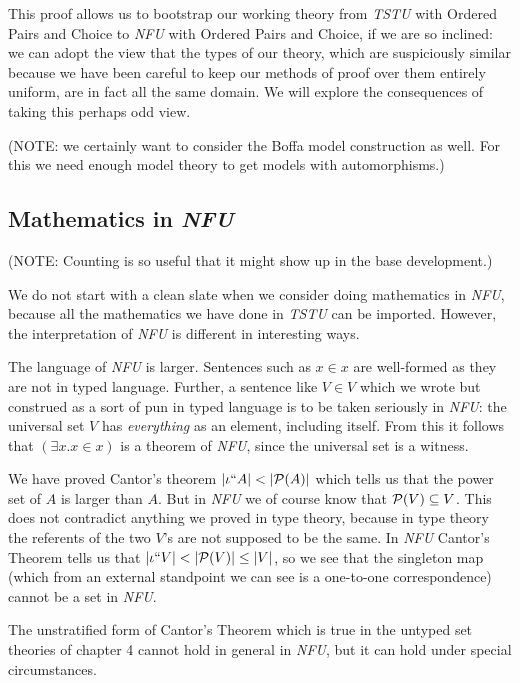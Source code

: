 \documentclass[12pt]{book}
\begin{document}
This proof allows us to bootstrap our working theory from {\em TSTU\/} with Ordered Pairs and Choice to {\em NFU\/} with Ordered Pairs and Choice, if we are so inclined:  we can adopt the view that the types of our theory, which are suspiciously similar because we have been careful to keep our methods of proof
over them entirely uniform, are in fact all the same domain.  We will explore the consequences of taking this perhaps odd view.

(NOTE:  we certainly want to consider the Boffa model construction as well.  For this we need enough model theory to get models with automorphisms.)


\subsection{Mathematics in {\em NFU\/}}

(NOTE:  Counting is so useful that it might show up in the base development.)

We do not start with a clean slate when we consider doing mathematics in {\em NFU\/}, because all the mathematics we have done in {\em TSTU\/} can be imported.  However, the interpretation of {\em NFU\/} is different in interesting ways.

The language of {\em NFU\/} is larger.  Sentences such as $x \in x$ are well-formed as they are not in typed language.  Further, a sentence like $V \in V$ which we wrote but construed as a sort of pun in typed language is to be taken seriously in 
{\em NFU\/}:  the universal set $V$ has {\em everything\/} as an element, including itself.  From this it follows that $(\exists x. x \in x)$ is a theorem of {\em NFU\/}, since the universal set is a witness.

We have proved Cantor's theorem $|\iota``A|<|{\cal P}(A)|$ which tells us that the power set of $A$ is larger than $A$.  But in {\em NFU\/} we of course know that ${\cal P}(V) \subseteq V$.   This does not contradict anything we proved in type theory, because in type theory the referents of the two
$V$'s are not supposed to be the same.  In {\em NFU\/} Cantor's Theorem tells us that $|\iota``V| < |{\cal P}(V)| \leq |V|$, so we see that the singleton map (which from an external standpoint we can see is a one-to-one correspondence) cannot be a set in {\em NFU\/}.

The unstratified form of Cantor's Theorem which is true in the untyped set theories of chapter 4 cannot hold in general in {\em NFU\/}, but it can hold under special circumstances.
\end{document}
